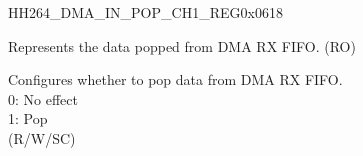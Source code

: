 \begin{register}{H}{H264\_DMA\_IN\_POP\_CH1\_REG}{0x0618}\label{regdesc:H264DMAINPOPCH1REG}
%
%
%
\regnewline%
\begin{regdesc}\begin{reglist}
\label{fielddesc:H264DMAINFIFORDATACH1}\item [H264\_DMA\_INFIFO\_RDATA\_CH1] Represents the data popped from DMA RX FIFO. (RO)
\label{fielddesc:H264DMAINFIFOPOPCH1}\item [H264\_DMA\_INFIFO\_POP\_CH1] Configures whether to pop data from DMA RX FIFO.\\
0: No effect\\
1: Pop\\ (R/W/SC)
\end{reglist}\end{regdesc}
\end{register}


